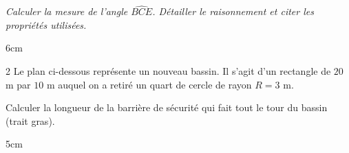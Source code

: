\documentclass[a4paper]{book}
\begin{document}
{\begin{exercice}
        \textit{Calculer la mesure de l'angle $\widehat{BCE}$. Détailler le raisonnement et citer les propriétés utilisées.}   

        \begin{ZoneReponse}{6cm}
        \end{ZoneReponse}
    \end{exercice}


    \begin{exerciceNote}{2}
        Le plan ci-dessous représente un nouveau bassin. Il s'agit d'un rectangle de $20$ m par $10$ m auquel on a retiré un quart de cercle de rayon $R = 3$ m.

        \begin{center}
        \end{center}
        
        Calculer la longueur de la barrière de sécurité qui fait tout le tour du bassin (trait gras). 

        \begin{ZoneReponse}{5cm}
        \end{ZoneReponse}
    \end{exerciceNote}

}
\end{document}
